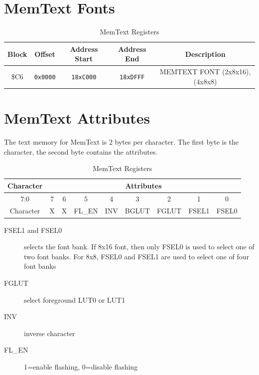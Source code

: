 \section*{MemText Fonts}

\begin{table}[ht]
    \begin{center}
        \begin{tabular}{|c|c|c|c|c|} \hline
          Block & Offset & Address Start & Address End & Description \\\hline\hline
          \$C6 & \verb+0x0000+ & \verb+18xC000+ & \verb+18xDFFF+ & MEMTEXT FONT (2x8x16),(4x8x8) \\ \hline
        \end{tabular}
    \end{center}
    \caption{MemText Registers}
    \label{tab:memtext_fonts}
\end{table}

\section*{MemText Attributes}

The text memory for MemText is 2 bytes per character.  The first byte is the character, the second byte contains the attributes.

\begin{table}[ht]
    \begin{center}
        \begin{tabular}{|c|c|c|c|c|c|c|c|c|} \hline
          Character &  \multicolumn{8}{|c|}{Attributes} \\\hline\hline 
          7:0 & 7 & 6 & 5 & 4 & 3 & 2 & 1 & 0 \\ \hline 
          Character & X & X & FL\_EN & INV & BGLUT & FGLUT & FSEL1 & FSEL0 \\ \hline 
          
        \end{tabular}
    \end{center}
    \caption{MemText Registers}
    \label{tab:memtext_characters}
\end{table}

\begin{description}
    \item[FSEL1 and FSEL0] selects the font bank.  If 8x16 font, then only FSEL0 is used to select one of two font banks.  For 8x8, FSEL0 and FSEL1 are used to select one of four font banks

    \item[FGLUT] select foreground LUT0 or LUT1

    \item[INV] inverse character

    \item[FL\_EN] 1=enable flashing, 0=disable flashing

\end{description}
